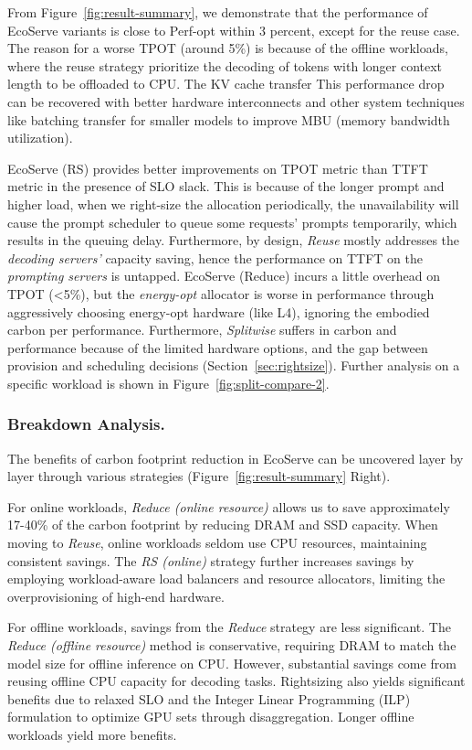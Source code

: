 From Figure~\ref{fig:result-summary}, we demonstrate that the performance of EcoServe variants is close to Perf-opt within 3 percent, except for the reuse case. The reason for a worse TPOT (around 5\%) is because of the offline workloads, where the reuse strategy prioritize the decoding of tokens with longer context length to be offloaded to CPU. The KV cache transfer This performance drop can be recovered with better hardware interconnects and other system techniques like batching transfer for smaller models to improve MBU (memory bandwidth utilization).

EcoServe (RS) provides better improvements on TPOT metric than TTFT metric in the presence of SLO slack.
This is because of the longer prompt and higher load, when we right-size the allocation periodically, the unavailability will cause the prompt scheduler to queue some requests' prompts temporarily, which results in the queuing delay. Furthermore, by design, \textit{Reuse} mostly addresses the \textit{decoding servers'} capacity saving, hence the performance on TTFT on the \textit{prompting servers} is untapped. EcoServe (Reduce) incurs a little overhead on TPOT (<5\%), but the \textit{energy-opt} allocator is worse in performance through aggressively choosing energy-opt hardware (like L4), ignoring the embodied carbon per performance. Furthermore, \textit{Splitwise} suffers in carbon and performance because of the limited hardware options, and the gap between provision and scheduling decisions (Section~\ref{sec:rightsize}). Further analysis on a specific workload is shown in Figure~\ref{fig:split-compare-2}.


\subsubsection{Breakdown Analysis.}

The benefits of carbon footprint reduction in EcoServe can be uncovered layer by layer through various strategies (Figure~\ref{fig:result-summary} Right).

For online workloads, \textit{Reduce (online resource)} allows us to save approximately 17-40\% of the carbon footprint by reducing DRAM and SSD capacity. When moving to \textit{Reuse}, online workloads seldom use CPU resources, maintaining consistent savings. The \textit{RS (online)} strategy further increases savings by employing workload-aware load balancers and resource allocators, limiting the overprovisioning of high-end hardware.


For offline workloads, savings from the \textit{Reduce} strategy are less significant. The \textit{Reduce (offline resource)} method is conservative, requiring DRAM to match the model size for offline inference on CPU. However, substantial savings come from reusing offline CPU capacity for decoding tasks. Rightsizing also yields significant benefits due to relaxed SLO and the Integer Linear Programming (ILP) formulation to optimize GPU sets through disaggregation. Longer offline workloads yield more benefits. 

